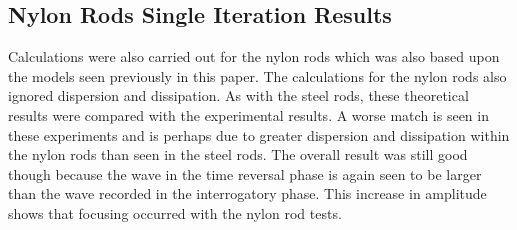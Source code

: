  \subsection{Nylon Rods Single Iteration Results}
 Calculations were also carried out for the nylon rods which was also based upon the models seen previously in this paper. The calculations for the nylon rods also ignored dispersion and dissipation. As with the steel rods, these theoretical results were compared with the experimental results. A worse match is seen in these experiments and is perhaps due to greater dispersion and dissipation within the nylon rods than seen in the steel rods. The overall result was still good though because the wave in the time reversal phase is again seen to be larger than the wave recorded in the interrogatory phase. This increase in amplitude shows that focusing occurred with the nylon rod tests.
 
